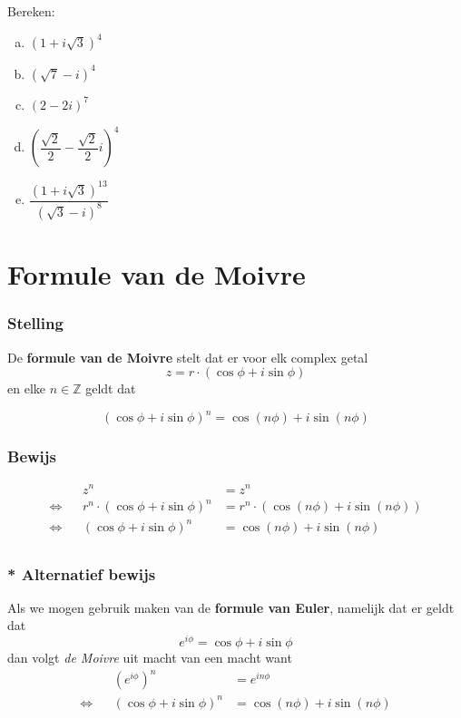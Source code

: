 \documentclass[12pt,twoside,a4]{article}
\begin{document}
\begin{oefening}
Bereken:
\begin{multicols}{2}
\begin{enumerate}[(a)]
  \itemsep.5em
  \item $\displaystyle \left(1+i\sqrt{3}\right)^4$
  \item $\displaystyle \left(\sqrt{7}-i\right)^4$
  \item $\displaystyle \left(2-2i\right)^7$
  \item $\displaystyle \left(\dfrac{\sqrt{2}}{2}-\dfrac{\sqrt{2}}{2}i\right)^4$
  \item $\displaystyle \dfrac{\left(1+i\sqrt{3}\right)^{13}}{\left(\sqrt{3}-i\right)^8}$
\end{enumerate}
\end{multicols}
\end{oefening}

\pagebreak

\section{Formule van de Moivre}

\subsubsection*{Stelling}
De {\bf formule van de Moivre} stelt dat er voor elk complex getal
\[z=r \cdot (\cos \phi + i\sin \phi)\]
en elke $n\in\mathbb{Z}$ geldt dat
\begin{mdframed}
  \[ \left( \cos \phi + i\sin \phi \right)^n = \cos( n\phi ) + i\sin( n\phi ) \]
\end{mdframed}

\subsubsection*{Bewijs}
\begin{align*}
     &&                        z^n &= z^n\\
  \Leftrightarrow && r^n \cdot (\cos \phi + i \sin \phi)^n &= r^n \cdot (\cos( n\phi ) + i\sin( n\phi ))\\
  \Leftrightarrow && (\cos \phi + i \sin \phi)^n &= \cos( n\phi ) + i\sin( n\phi )\\
\end{align*}

\subsubsection*{* Alternatief bewijs}
Als we mogen gebruik maken van de {\bf formule van Euler}, namelijk dat er geldt dat
\[e^{i\phi} = \cos\phi + i\sin\phi \]
dan volgt {\em de Moivre} uit macht van een macht want
\begin{align*}
     && \left(e^{i\phi}\right)^n &= e^{in\phi}\\
  \Leftrightarrow && (\cos \phi + i \sin \phi)^n &= \cos( n\phi ) + i\sin( n\phi )\\
\end{align*}
\end{document}
